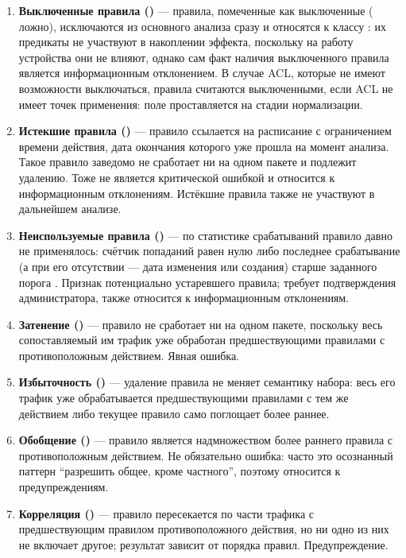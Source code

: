 \begin{enumerate}
    \item \textbf{Выключенные правила ()} --- правила, помеченные как выключенные ( ложно), исключаются из основного анализа сразу и относятся к классу : их предикаты не участвуют в накоплении эффекта, поскольку на работу устройства они не влияют, однако сам факт наличия выключенного правила является информационным отклонением. В случае ACL, которые не имеют возможности выключаться, правила считаются выключенными, если ACL не имеет точек применения: поле  проставляется на стадии нормализации.
    \item \textbf{Истекшие правила ()} --- правило ссылается на расписание с ограничением времени действия, дата окончания которого уже прошла на момент анализа. Такое правило заведомо не сработает ни на одном пакете и подлежит удалению. Тоже не является критической ошибкой и относится к информационным отклонениям. Истёкшие правила также не участвуют в дальнейшем анализе.
    \item \textbf{Неиспользуемые правила ()} --- по статистике срабатываний правило давно не применялось: счётчик попаданий равен нулю либо последнее срабатывание (а при его отсутствии --- дата изменения или создания) старше заданного порога . Признак потенциально устаревшего правила; требует подтверждения администратора, также относится к информационным отклонениям.
    \item \textbf{Затенение ()} --- правило не сработает ни на одном пакете, поскольку весь сопоставляемый им трафик уже обработан предшествующими правилами с противоположным действием. Явная ошибка.
    \item \textbf{Избыточность ()} --- удаление правила не меняет семантику набора: весь его трафик уже обрабатывается предшествующими правилами с тем же действием либо текущее правило само поглощает более раннее.
    \item \textbf{Обобщение ()} --- правило является надмножеством более раннего правила с противоположным действием. Не обязательно ошибка: часто это осознанный паттерн ``разрешить общее, кроме частного'', поэтому относится к предупреждениям.
    \item \textbf{Корреляция ()} --- правило пересекается по части трафика с предшествующим правилом противоположного действия, но ни одно из них не включает другое; результат зависит от порядка правил. Предупреждение.
\end{enumerate}

